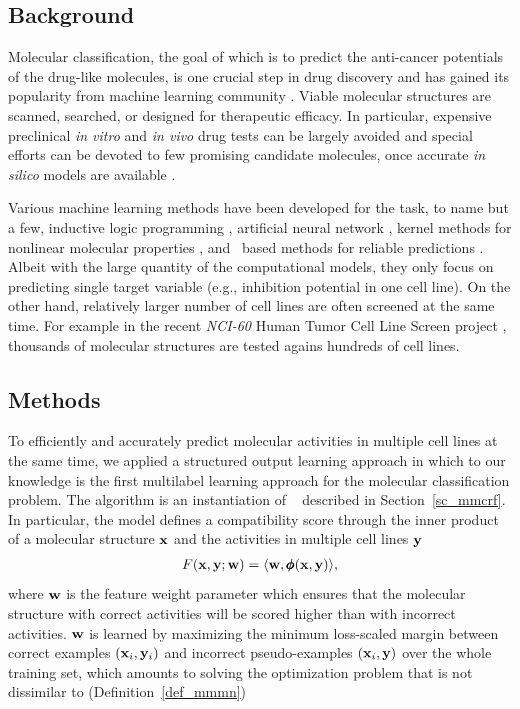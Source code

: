 {%
%
\subsection{Background}

Molecular classification, the goal of which is to predict the anti-cancer potentials of the drug-like molecules, is one crucial step in drug discovery and has gained its popularity from machine learning community \citep{Singh12qsar,Dutt12classification}.
Viable molecular structures are scanned, searched, or designed for therapeutic efficacy.
In particular, expensive preclinical \textit{in vitro} and \textit{in vivo} drug tests can be largely avoided and special efforts can be devoted to few promising candidate molecules, once accurate \textit{in silico} models are available \citep{Burbidg01drug}.

Various machine learning methods have been developed for the task, to name but a few, inductive logic programming \citep{King96structure}, artificial neural network \citep{Bernazzani06predicting}, kernel methods for nonlinear molecular properties \citep{Trotter01drug,Ralaivola05graph,Swamidass05kernel,Ceroni07classification}, and \svm\ based methods for reliable predictions \citep{Trotter01drug,Byvatov03comparison,Xue04effect}.
Albeit with the large quantity of the computational models, they only focus on predicting single target variable (e.g., inhibition potential in one cell line). 
On the other hand, relatively larger number of cell lines are often screened at the same time.
For example in the recent \textit{NCI-60} {Human Tumor Cell Line Screen} project \citep{Shoemaker06the}, thousands of molecular structures are tested agains hundreds of cell lines.



%
%
\subsection{Methods}

To efficiently and accurately predict molecular activities in multiple cell lines at the same time, we applied a structured output learning approach in  which to our knowledge is the first multilabel learning approach for the molecular classification problem.
The algorithm is an instantiation of \mmcrf\ \citep{Rousu07} described in Section~\ref{sc_mmcrf}.
In particular, the model defines a compatibility score through the inner product of a molecular structure $\mathbf {x}$ and the activities in multiple cell lines $\mathbf {y}$
\begin{align*}
	F(\mathbf {x},\mathbf {y};\mathbf {w}) = \langle \mathbf {w}, \pmb \phi(\mathbf {x},\mathbf {y}) \rangle,
\end{align*}
where $\mathbf {w}$ is the feature weight parameter which ensures that the molecular structure with correct activities will be scored higher than with incorrect activities.
$\mathbf {w}$ is learned by maximizing the minimum loss-scaled margin between correct examples $(\mathbf {x}_i,\mathbf {y}_i)$ and incorrect pseudo-examples $(\mathbf {x}_i,\mathbf {y})$ over the whole training set, which amounts to solving the optimization problem that is not dissimilar to (Definition~\ref{def_mmmn})

}
